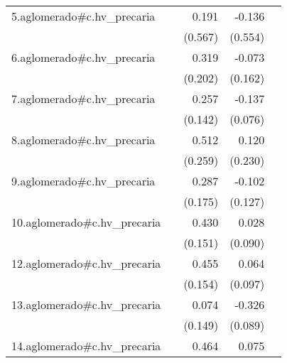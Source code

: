 {\begin{longtable}{l*{4}{D{.}{.}{-1}}}
\addlinespace
5.aglomerado#c.hv\_precaria&                     &       0.191         &      -0.136         &                     \\
            &                     &     (0.567)         &     (0.554)         &                     \\
\addlinespace
6.aglomerado#c.hv\_precaria&                     &       0.319         &      -0.073         &                     \\
            &                     &     (0.202)         &     (0.162)         &                     \\
\addlinespace
7.aglomerado#c.hv\_precaria&                     &       0.257         &      -0.137         &                     \\
            &                     &     (0.142)         &     (0.076)         &                     \\
\addlinespace
8.aglomerado#c.hv\_precaria&                     &       0.512\sym{*}  &       0.120         &                     \\
            &                     &     (0.259)         &     (0.230)         &                     \\
\addlinespace
9.aglomerado#c.hv\_precaria&                     &       0.287         &      -0.102         &                     \\
            &                     &     (0.175)         &     (0.127)         &                     \\
\addlinespace
10.aglomerado#c.hv\_precaria&                     &       0.430\sym{**} &       0.028         &                     \\
            &                     &     (0.151)         &     (0.090)         &                     \\
\addlinespace
12.aglomerado#c.hv\_precaria&                     &       0.455\sym{**} &       0.064         &                     \\
            &                     &     (0.154)         &     (0.097)         &                     \\
\addlinespace
13.aglomerado#c.hv\_precaria&                     &       0.074         &      -0.326\sym{***}&                     \\
            &                     &     (0.149)         &     (0.089)         &                     \\
\addlinespace
14.aglomerado#c.hv\_precaria&                     &       0.464\sym{**} &       0.075         &                     \\

\end{longtable}}
